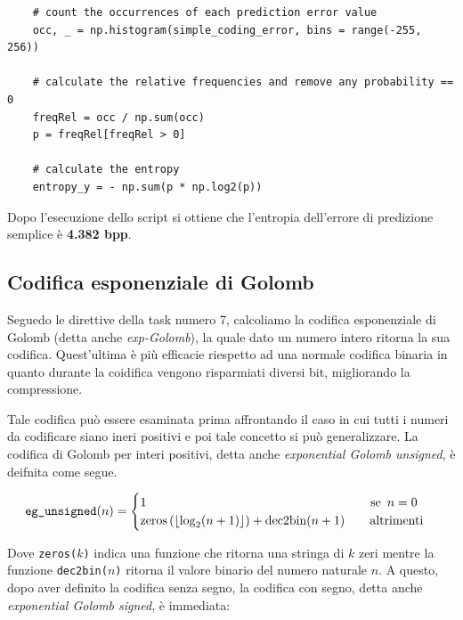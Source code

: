 \begin{lstlisting}
    # count the occurrences of each prediction error value
    occ, _ = np.histogram(simple_coding_error, bins = range(-255, 256))

    # calculate the relative frequencies and remove any probability == 0
    freqRel = occ / np.sum(occ)
    p = freqRel[freqRel > 0]

    # calculate the entropy
    entropy_y = - np.sum(p * np.log2(p))
\end{lstlisting}

\noindent Dopo l'esecuzione dello script si ottiene che l'entropia dell'errore di predizione semplice è \textbf{4.382 bpp}.



\vspace{15px}\subsection{Codifica esponenziale di Golomb}\label{exp-golomb}
Seguedo le direttive della task numero 7, calcoliamo la codifica esponenziale di Golomb (detta anche \textsl{exp-Golomb}), la quale dato un numero intero ritorna la sua codifica. Quest'ultima è più efficacie riespetto ad una normale codifica binaria in quanto durante la coidifica vengono risparmiati diversi bit, migliorando la compressione. 

Tale codifica può essere esaminata prima affrontando il caso in cui tutti i numeri da codificare siano ineri positivi e poi tale concetto si può generalizzare. La codifica di Golomb per interi positivi, detta anche \textsl{exponential Golomb unsigned}, è deifnita come segue.

\begin{gather*}
    \text{\texttt{eg\_unsigned}}(n) =
    \begin{cases}
        1 \hspace{180px} \text{se } \, n = 0 \\
        \text{zeros}\left( \left\lfloor \log_2(n + 1) \right\rfloor \right) + \text{dec2bin}(n + 1) \hspace{20px} \text{altrimenti}
    \end{cases}
\end{gather*}

\noindent Dove \texttt{zeros(}$k$\texttt{)} indica una funzione che ritorna una stringa di $k$ zeri mentre la funzione \texttt{dec2bin(}$n$\texttt{)} ritorna il valore binario del numero naturale $n$. A questo, dopo aver definito la codifica senza segno, la codifica con segno, detta anche \textsl{exponential Golomb signed}, è immediata:

